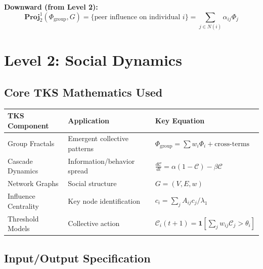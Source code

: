 \documentclass[11pt,twoside]{book}
\renewcommand{\arraystretch}{1.2}
\newcommand{\Frac}{\Phi}
\newcommand{\GroupFrac}{\Phi_{\mathrm{group}}}
\newcommand{\Cascade}{\mathcal{C}}
\newcommand{\Project}[2]{\mathbf{Proj}_{#1}^{#2}}
\begin{document}
\textbf{Downward (from Level 2):}
\begin{equation}
    \Project{2}{1}(\GroupFrac, G) = \{\text{peer influence on individual } i\} =
    \sum_{j \in N(i)} \alpha_{ij} \Frac_j
\end{equation}

\chapter{Level 2: Social Dynamics}
\label{ch:level2-spec}

\section{Core TKS Mathematics Used}

\begin{center}
\renewcommand{\arraystretch}{1.4}
\begin{tabularx}{\textwidth}{>{\raggedright\arraybackslash}p{3cm}|>{\raggedright\arraybackslash}X|>{\raggedright\arraybackslash}p{4cm}}
\toprule
\textbf{TKS Component} & \textbf{Application} & \textbf{Key Equation} \\
\midrule
Group Fractals & Emergent collective patterns & $\GroupFrac = \sum w_i \Frac_i + \text{cross-terms}$ \\
Cascade Dynamics & Information/behavior spread & $\frac{d\Cascade}{dt} = \alpha(1-\Cascade) - \beta\Cascade$ \\
Network Graphs & Social structure & $G = (V, E, w)$ \\
Influence Centrality & Key node identification & $c_i = \sum_j A_{ij} c_j / \lambda_1$ \\
Threshold Models & Collective action & $\Cascade_i(t+1) = \mathbf{1}[\sum_j w_{ij}\Cascade_j > \theta_i]$ \\
\bottomrule
\end{tabularx}
\end{center}

\section{Input/Output Specification}
\end{document}
